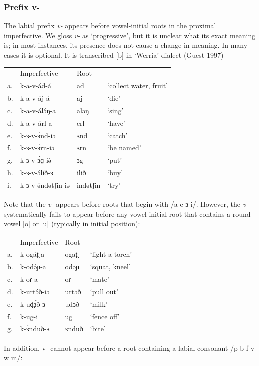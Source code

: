 \subsubsection{Prefix v-}
The labial prefix \textit{v-} appears before vowel-initial roots in the proximal imperfective. We gloss \textit{v-} as ‘progressive’, but it is unclear what its exact meaning is; in most instances, its presence does not cause a change in meaning. In many cases it is optional. It is transcribed [b] in ‘Werria’ dialect (Guest 1997)

\ea
\begin{tabular}[t]{llll}
&	 	Imperfective	&	Root\\
	a.&	k-a-v-ád-á		&	ad		&	‘collect water, fruit’	\\
	b.&	k-a-v-áj-á		&	aj		&	‘die’\\
	c.&	k-a-v-álə́ŋ-a		&	aləŋ	&	‘sing’\\
	d.&	k-a-v-árl-a		&	erl		&	‘have’\\
	e.&	k-ɜ-v-ɜ́nd-iə	&	ɜnd		&	‘catch’\\
	f.&	k-ɜ-v-ɜ́rn-iə	&	ɜrn		&	‘be named’\\
	g.&	k-ɜ-v-ɜ́ɡ-iə́		&	ɜg		&	‘put’\\
	h.&	k-ɜ-v-ə́líð-ɜ		&	ilið		&	‘buy’\\
	i.&	k-ɜ-v-ə́ndətʃin-iə&	indətʃin&	‘try’\\
\end{tabular}
\z

Note that the \textit{v-} appears before roots that begin with /a e ɜ i/. However, the \textit{v-} systematically fails to appear before any vowel-initial root that contains a round vowel [o] or [u] (typically in initial position):

\ea
\begin{tabular}[t]{llll}
&	 	Imperfective	&	Root\\
	a.&	k-ogát̪-a	&	ogat̪	&	‘light a torch’	\\
	b.&	k-odə́ɲ-a		&	odəɲ	&	‘squat, kneel’\\
	c.&	k-oɾ-a		&	oɾ		&	‘mate’\\
	d.&	k-urtə́ð-iə	&	urtəð	&	‘pull out’\\
	e.&	k-ud̪ɜ́ð-ɜ	&	udɜð	&	‘milk’\\
	f.&	k-ug-i		&	ug		&	‘fence off’\\
	g.&	k-ɜ́nduð-ɜ	&	ɜnduð	&	‘bite’\\
\end{tabular}
\z

In addition, v- cannot appear before a root containing a labial consonant /p b f v w m/:

